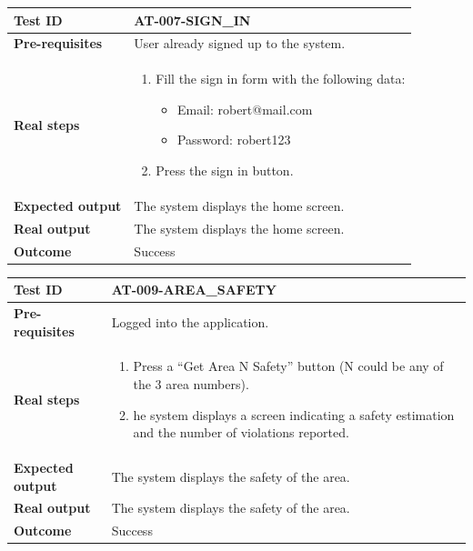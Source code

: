 \begin{table}[H]
    \centering
    \begin{tabular}{p{3cm}p{10cm}}
    \textbf{Test ID} & AT-007-SIGN\_IN \\ \hline
    \textbf{Pre-requisites} & User already signed up to the system. \\ \hline
    \textbf{Real steps} & 
        \begin{enumerate} \itemsep0em
            \item Fill the sign in form with the following data:
            \begin{itemize}[label={}] \itemsep0em
                \item Email: robert@mail.com
                \item Password: robert123
            \end{itemize}
            \item Press the sign in button.
        \end{enumerate} \\ \hline
    \textbf{Expected output} & The system displays the home screen. \\ \hline
    \textbf{Real output} & The system displays the home screen. \\ \hline
    \textbf{Outcome} & Success \\ \hline
    \end{tabular}
\end{table}

\begin{table}[H]
    \centering
    \begin{tabular}{p{3cm}p{10cm}}
    \textbf{Test ID} & AT-009-AREA\_SAFETY \\ \hline
    \textbf{Pre-requisites} & Logged into the application. \\ \hline
    \textbf{Real steps} & 
        \begin{enumerate} \itemsep0em
            \item Press a “Get Area N Safety” button (N could be any of the 3 area numbers).
            \item he system displays a screen indicating a safety estimation and the number of violations reported.
        \end{enumerate} \\ \hline
    \textbf{Expected output} & The system displays the safety of the area. \\ \hline
    \textbf{Real output} & The system displays the safety of the area. \\ \hline
    \textbf{Outcome} & Success \\ \hline
    \end{tabular}
\end{table}


